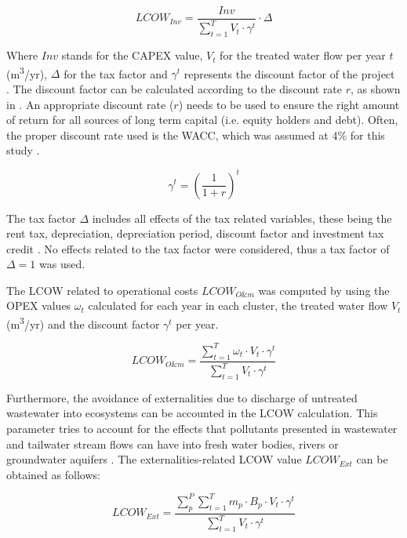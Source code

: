 \begin{equation}\label{eq:lcow_inv}
LCOW_{Inv} = \frac{Inv}{\sum_{t=1}^{T} V_{t}\cdot\gamma^{t}}\cdot\Delta
\end{equation}

Where $Inv$ stands for the CAPEX value, $V_{t}$ for the treated water flow per year $t$ (m\textsuperscript{3}/yr), $\Delta$ for the tax factor and $\gamma^{t}$ represents the discount factor of the project . The discount factor can be calculated according to the discount rate $r$, as shown in . An appropriate discount rate ($r$) needs to be used to ensure the right amount of return for all sources of long term capital (i.e. equity holders and debt). Often, the proper discount rate used is the WACC, which was assumed at 4\% for this study \cite{prospectscostcompetitive2013}. 

\begin{equation}\label{eq:gamma}
\gamma^{t} = \left(\frac{1}{1+r}\right)^{t}
\end{equation}

The tax factor $\Delta$ includes all effects of the tax related variables, these being the rent tax, depreciation, depreciation period, discount factor and investment tax credit \cite{prospectscostcompetitive2013}. No effects related to the tax factor were considered, thus a tax factor of $\Delta=1$ was used.

The LCOW related to operational costs $LCOW_{O\&m}$  was computed by using the OPEX values $\omega_{t}$ calculated for each year in each cluster, the treated water flow $V_{t}$ (m\textsuperscript{3}/yr) and the discount factor $\gamma^t$ per year.

\begin{equation}\label{eq:lcow_om}
LCOW_{O\&m} = \frac{\sum_{t=1}^{T} \omega_{t}\cdot V_{t}\cdot\gamma^{t}}{\sum_{t=1}^{T} V_{t}\cdot\gamma^{t}}
\end{equation}

Furthermore, the avoidance of externalities due to discharge of untreated wastewater into ecosystems can be accounted in the LCOW calculation. This parameter tries to account for the effects that pollutants presented in wastewater and tailwater stream flows can have into fresh water bodies, rivers or groundwater aquifers \cite{Assessmentwastewatertreatment2012}. The externalities-related LCOW value $LCOW_{Ext}$  can be obtained as follows:

\begin{equation}\label{eq:lcow_ext}
LCOW_{Ext} = \frac{\sum_{p}^{P}\sum_{t=1}^{T} m_{p}\cdot B_p\cdot V_{t}\cdot\gamma^{t}}{\sum_{t=1}^{T} V_{t}\cdot\gamma^{t}}
\end{equation}

